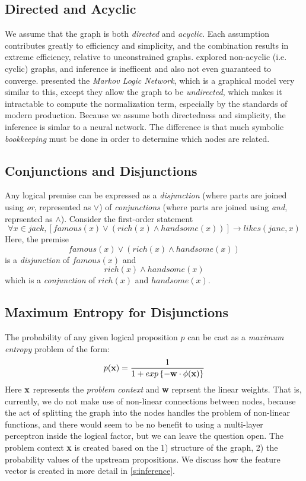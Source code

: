 \documentclass[12pt]{article}
\begin{document}
\subsection{Directed and Acyclic}
We assume that the graph is both {\em directed} and {\em acyclic}.
Each assumption contributes greatly to efficiency and simplicity, and the combination results in extreme efficiency, relative to unconstrained graphs.
\cite{smith2008dependency} explored non-acyclic (i.e. cyclic) graphs, and inference is inefficent and also not even guaranteed to converge.
\cite{richardson2006markov} presented the {\em Markov Logic Network}, which is a graphical model very similar to this, except they allow the graph to be {\em undirected}, which makes it intractable to compute the normalization term, especially by the standards of modern production.
Because we assume both directedness and simplicity, the inference is simlar to a neural network.
The difference is that much symbolic {\em bookkeeping} must be done in order to determine which nodes are related.

\subsection{Conjunctions and Disjunctions}
Any logical premise can be expressed as a {\em disjunction} (where parts are joined using {\em or}, represented as $\vee$) of {\em conjunctions} (where parts are joined using {\em and}, reprsented as $\land$).
Consider the first-order statement
\[ \forall x \in jack, \left[famous(x) \vee \left(rich(x) \wedge handsome(x)\right)\right] \rightarrow likes(jane, x)\]
Here, the premise 
\[ famous(x) \vee \left(rich(x) \wedge handsome(x)\right)\]
is a {\em disjunction} of $famous(x)$ and 
\[ rich(x) \wedge handsome(x)\]
which is a {\em conjunction} of $rich(x)$ and $handsome(x)$.

\subsection{Maximum Entropy for Disjunctions}
The probability of any given logical proposition $p$ can be cast as a {\em maximum entropy} problem of the form:
\begin{equation}
    p({\bf x}) = \frac{1}{1 + exp\left\{-\mathbf{w} \cdot \phi({\bf x})\right\}}
\end{equation}
Here ${\bf x}$ represents the {\em problem context} and {\bf w} reprsent the linear weights.
That is, currently, we do not make use of non-linear connections between nodes, because the act of splitting the graph into the nodes handles the problem of non-linear functions, and there would seem to be no benefit to using a multi-layer perceptron inside the logical factor, but we can leave the question open.
The problem context {\bf x} is created based on the 1) structure of the graph, 2) the probability values of the upstream propositions.
We discuss how the feature vector is created in more detail in \ref{s:inference}.
\end{document}
